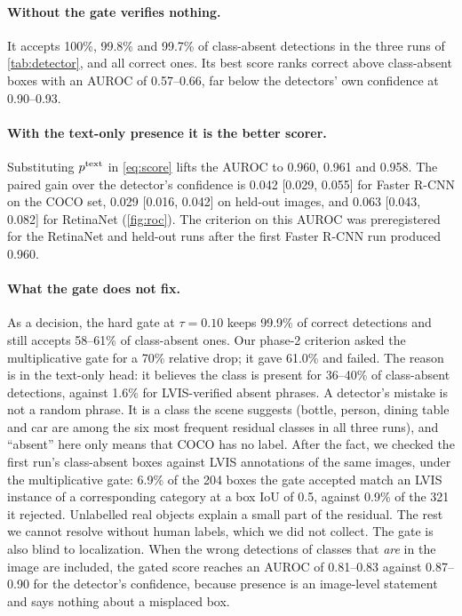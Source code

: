 \paragraph{Without the gate \sam{} verifies nothing.}
It accepts 100\%, 99.8\% and 99.7\% of class-absent detections in the three runs of \cref{tab:detector}, and all correct ones.
Its best score ranks correct above class-absent boxes with an AUROC of 0.57--0.66, far below the detectors' own confidence at 0.90--0.93.

\paragraph{With the text-only presence it is the better scorer.}
Substituting $p^{\mathrm{text}}$ in \cref{eq:score} lifts the AUROC to 0.960, 0.961 and 0.958.
The paired gain over the detector's confidence is 0.042 [0.029, 0.055] for Faster R-CNN on the COCO set, 0.029 [0.016, 0.042] on held-out images, and 0.063 [0.043, 0.082] for RetinaNet (\cref{fig:roc}).
The criterion on this AUROC was preregistered for the RetinaNet and held-out runs after the first Faster R-CNN run produced 0.960.

\paragraph{What the gate does not fix.}
As a decision, the hard gate at $\tau = 0.10$ keeps 99.9\% of correct detections and still accepts 58--61\% of class-absent ones.
Our phase-2 criterion asked the multiplicative gate for a 70\% relative drop; it gave 61.0\% and failed.
The reason is in the text-only head: it believes the class is present for 36--40\% of class-absent detections, against 1.6\% for LVIS-verified absent phrases.
A detector's mistake is not a random phrase.
It is a class the scene suggests (bottle, person, dining table and car are among the six most frequent residual classes in all three runs), and ``absent'' here only means that COCO has no label.
After the fact, we checked the first run's class-absent boxes against LVIS annotations of the same images, under the multiplicative gate: 6.9\% of the 204 boxes the gate accepted match an LVIS instance of a corresponding category at a box IoU of 0.5, against 0.9\% of the 321 it rejected.
Unlabelled real objects explain a small part of the residual.
The rest we cannot resolve without human labels, which we did not collect.
The gate is also blind to localization.
When the wrong detections of classes that \emph{are} in the image are included, the gated score reaches an AUROC of 0.81--0.83 against 0.87--0.90 for the detector's confidence, because presence is an image-level statement and says nothing about a misplaced box.

